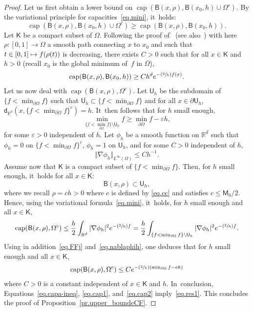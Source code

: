 \documentclass[JEP,XML,SOM,Unicode,NoEqCountersInSection,NoFloatCountersInSection,published]{cedram}
\newcommand{\Psfrac}[2]{(\sfrac{#1}{#2})}
\let\epsilon\varepsilon
\newcommand\mto{\mathchoice{\longmapsto}{\mapsto}{\mapsto}{\mapsto}}
\DeclareMathOperator{\capp}{cap}
\theoremstyle{plain}
\theoremstyle{definition}
\begin{document}
\begin{proof}
Let us first obtain a lower bound on $\capp(\mathsf B(x,\rho), \mathsf B(x_0,h) \cup \Omega^c)$.
By the variational principle for capacities~\eqref{eq.mini}, it~holds:
\[
\capp(\mathsf B(x,\rho), \mathsf B(x_0,h) \cup \Omega^c)\ge \capp(\mathsf B(x,\rho), \mathsf B(x_0,h)).
\]
Let $\mathsf K$ be a compact subset of $\Omega$.
Following the proof of~\cite[Lem.\,7.10]{landim2017dirichlet} (see also~\cite[Prop.\,4.7]{BEGK}) with here $\rho:[0,1]\to \Omega$ a smooth path connecting $x$ to $x_0$ and such that $t\in [0,1]\mto f(\rho(t))$ is decreasing, there exists $C>0$ such that for all $x\in \mathsf K$ and $h>0$ (recall $x_0$ is the global minimum of~$f$ in $\overline{\Omega}$),
\begin{equation}\label{eq.cap1}
\capp(\mathsf B(x,\rho), \mathsf B(x_0,h))\ge C h^d e^{-\Psfrac 2h f(x)}.
\end{equation}
Let us now deal with $\capp(\mathsf B(x,\rho), \Omega^c) $.
Let
$\mathsf U_h$ be the subdomain of $\{f<\min_{\partial \Omega}f\}$ such that $\overline{\mathsf U_h }\subset \{f<\min_{\partial \Omega}f\} $ and for all $x\in \partial \mathsf U_h$,
$\mathsf d_{\mathbb R^d}(x, {\{f<\min_{\partial \Omega}f\} }^c)=h$. It~then follows that for $h$ small enough,
\begin{equation}\label{eq.FFj}
\min_{\{f<\min_{\partial \Omega}f\} \setminus {\mathsf U_h }} f\ge \min_{\partial \Omega}f -\epsilon h,
\end{equation}
for some $\epsilon >0$ independent of $h$. Let $\phi_h$ be a smooth function on $\mathbb R^d$ such that $\phi_h=0$ on $\{f<\min_{\partial \Omega}f\}^c$, $\phi_h=1$ on $ \mathsf U_h $, and for some $C>0$ independent of $h$,
\begin{equation}\label{eq.nablaphih}
\Vert \nabla \phi_h\Vert _{L^\infty(\Omega)}\le Ch^{-1}.
\end{equation}
Assume now that $\mathsf K$ is a compact subset of $\{f<\min_{\partial \Omega}f\}$. Then, for $h$ small enough, it~holds for all $x\in \mathsf K$:
\[
{\mathsf B(x,\rho)}\subset \mathsf U_h,
\]
where we recall $\rho=ch>0$ where $c$ is defined by \eqref{eq.cc} and satisfies $c\le \mathsf M_0/2$.
Hence, using the variational formula~\eqref{eq.mini}, it~holds, for $h$ small enough and all $x\in \mathsf K$,
\[
\capp(\mathsf B(x,\rho), \Omega^c) \le \frac h2 \int_{\mathbb R^d} \vert\nabla \phi_h \vert^2e^{-\Psfrac 2h f}= \frac h2 \int_{\{f<\min_{\partial \Omega}f\} \setminus {\mathsf U_h }} \vert\nabla \phi_h \vert^2e^{-\Psfrac 2h f}.
\]
Using in addition~\eqref{eq.FFj} and~\eqref{eq.nablaphih}, one deduces that for $h$ small enough and all $x\in \mathsf K$,
\begin{equation}\label{eq.cap2}
\capp(\mathsf B(x,\rho), \Omega^c) \le C e^{-\Psfrac 2h (\min_{\partial \Omega}f -ch)}
\end{equation}
where $C>0$ is a constant independent of $x\in \mathsf K$ and $h$. In~conclusion, Equations~\eqref{eq.capa-ineq}, \eqref{eq.cap1}, and~\eqref{eq.cap2} imply~\eqref{eq.res1}. This concludes the proof of Proposition~\ref{pr.upper_boundeCF}.
\end{proof}
\end{document}
